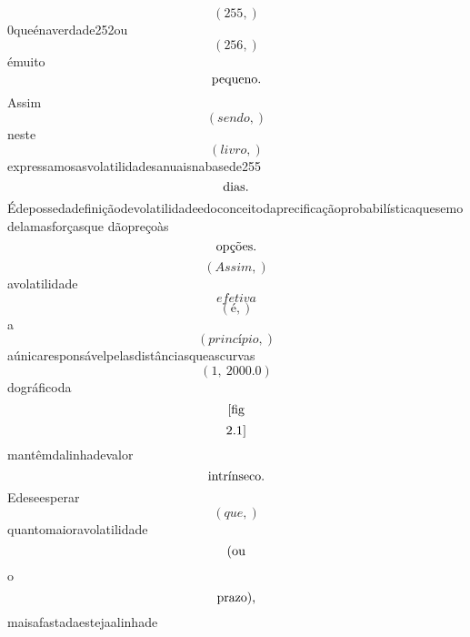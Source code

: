 \documentclass{article}
\begin{document}
\begin{equation}
\left( 255,\right)
\end{equation}0queénaverdade252ou\begin{equation}
\left( 256,\right)
\end{equation}émuito\begin{equation}
$pequeno.$
\end{equation}Assim\begin{equation}
\left( sendo,\right)
\end{equation}neste\begin{equation}
\left( livro,\right)
\end{equation}expressamosasvolatilidadesanuaisnabasede255\begin{equation}
$dias.$
\end{equation}Édepossedadefiniçãodevolatilidadeedoconceitodaprecificaçãoprobabilísticaquesemodelamasforçasque dãopreçoàs\begin{equation}
$opções.$
\end{equation}\begin{equation}
\left( Assim,\right)
\end{equation}avolatilidade\begin{equation}
efetiva
\end{equation}\begin{equation}
\left( é,\right)
\end{equation}a\begin{equation}
\left( princípio,\right)
\end{equation}aúnicaresponsávelpelasdistânciasqueascurvas\begin{equation}
\left( 1, \  2000.0\right)
\end{equation}dográficoda\begin{equation}
$[fig$
\end{equation}\begin{equation}
$2.1]$
\end{equation}mantêmdalinhadevalor\begin{equation}
$intrínseco.$
\end{equation}Edeseesperar\begin{equation}
\left( que,\right)
\end{equation}quantomaioravolatilidade\begin{equation}
$(ou$
\end{equation}o\begin{equation}
$prazo),$
\end{equation}maisafastadaestejaalinhade\begin{equation}

\end{equation}
\end{document}

